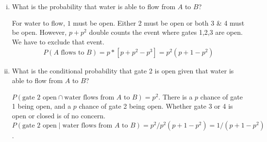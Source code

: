 \documentclass{article}
\begin{document}
\begin{enumerate}[i)]
 \item What is the probability that water is able to flow from $A$ to $B$?
 
 For water to flow, $1$ must be open. Either 2 must be open or both 3 \& 4 must be open. However, $p+p^2 $ double counts the event where gates 1,2,3 are open. We have to exclude that event. 
 \begin{align*}
     P(A \text{ flows to } B) = p * [p + p^2 - p^3] = p^2(p+1-p^2)
 \end{align*}
 \item What is the conditional probability that gate 2 is open given that water is able to flow from $A$ to $B$?
 
 $P(\text{gate 2 open} \cap \text{water flows from $A$ to $B$}) = p^2$. There is a $p$ chance of gate 1 being open, and a $p$ chance of gate 2 being open. Whether gate 3 or 4 is open or closed is of no concern. 
 $P(\text{gate 2 open} \mid \text{water flows from $A$ to $B$}) = p^2/p^2(p+1-p^2) = 1/(p+1-p^2)$.
\end{enumerate}
\end{document}
